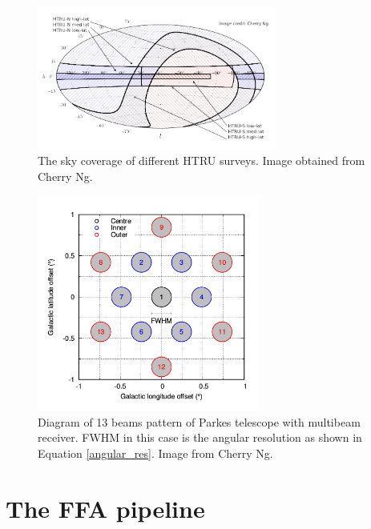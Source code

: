 \documentclass[thesis_msc.tex]{subfiles}
\begin{document}
        \begin{figure}[h!] 
\centering
\includegraphics[width=0.7\textwidth]{figures/HTRU-sky-3regions.png}
\caption{The sky coverage of different HTRU surveys. Image obtained from Cherry Ng.}
\label{HTRU_map}
\end{figure}

\begin{figure}[h!]
\centering
\includegraphics[width=0.650\textwidth]{figures/beampattern}
\caption{Diagram of 13 beams pattern of Parkes telescope with multibeam receiver. FWHM in this case is the angular resolution as shown in Equation \ref{angular_res}. Image from Cherry Ng.}\label{HTRU_beam}
\end{figure}

\section{The FFA pipeline}
\end{document}

